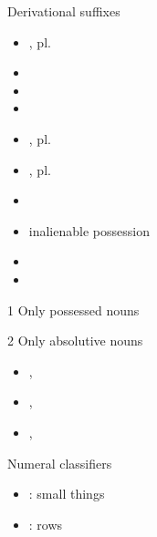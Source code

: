 \begin{frame}
\begin{columns}[t]
    \begin{column}{.20\linewidth}
    \begin{block}{Derivational suffixes}
        \begin{threeparttable}
        \begin{itemize}
            \item {}, pl.~  
            \item {} 
            \item {} 
            \item {} 
            \item {}, pl.~  
            \item {}, pl.~  
            \item {} 
            \item {} inalienable possession
            \item {} 
            \item {} 
        \end{itemize}
        \begin{tablenotes}
            \item[1] Only possessed nouns
            \item[2] Only absolutive nouns
        \end{tablenotes}
        \end{threeparttable}
    \end{block}
    \begin{example}
        \begin{itemize}
        \item {} ,  
        \item {} ,  
        \item {} ,  
        \end{itemize}
    \end{example}
    \begin{block}{Numeral classifiers}
        \begin{itemize}
        \item {} : small things
        \item {} : rows

\end{itemize}
\end{block}
\end{column}
\end{columns}
\end{frame}
